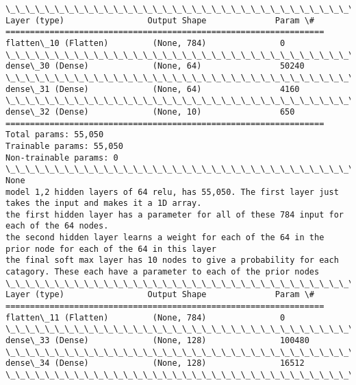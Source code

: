 \documentclass[11pt]{article}
\begin{document}
    \begin{Verbatim}[commandchars=\\\{\}]
\_\_\_\_\_\_\_\_\_\_\_\_\_\_\_\_\_\_\_\_\_\_\_\_\_\_\_\_\_\_\_\_\_\_\_\_\_\_\_\_\_\_\_\_\_\_\_\_\_\_\_\_\_\_\_\_\_\_\_\_\_\_\_\_\_
Layer (type)                 Output Shape              Param \#   
=================================================================
flatten\_10 (Flatten)         (None, 784)               0         
\_\_\_\_\_\_\_\_\_\_\_\_\_\_\_\_\_\_\_\_\_\_\_\_\_\_\_\_\_\_\_\_\_\_\_\_\_\_\_\_\_\_\_\_\_\_\_\_\_\_\_\_\_\_\_\_\_\_\_\_\_\_\_\_\_
dense\_30 (Dense)             (None, 64)                50240     
\_\_\_\_\_\_\_\_\_\_\_\_\_\_\_\_\_\_\_\_\_\_\_\_\_\_\_\_\_\_\_\_\_\_\_\_\_\_\_\_\_\_\_\_\_\_\_\_\_\_\_\_\_\_\_\_\_\_\_\_\_\_\_\_\_
dense\_31 (Dense)             (None, 64)                4160      
\_\_\_\_\_\_\_\_\_\_\_\_\_\_\_\_\_\_\_\_\_\_\_\_\_\_\_\_\_\_\_\_\_\_\_\_\_\_\_\_\_\_\_\_\_\_\_\_\_\_\_\_\_\_\_\_\_\_\_\_\_\_\_\_\_
dense\_32 (Dense)             (None, 10)                650       
=================================================================
Total params: 55,050
Trainable params: 55,050
Non-trainable params: 0
\_\_\_\_\_\_\_\_\_\_\_\_\_\_\_\_\_\_\_\_\_\_\_\_\_\_\_\_\_\_\_\_\_\_\_\_\_\_\_\_\_\_\_\_\_\_\_\_\_\_\_\_\_\_\_\_\_\_\_\_\_\_\_\_\_
None
model 1,2 hidden layers of 64 relu, has 55,050. The first layer just takes the input and makes it a 1D array.
the first hidden layer has a parameter for all of these 784 input for each of the 64 nodes.
the second hidden layer learns a weight for each of the 64 in the prior node for each of the 64 in this layer
the final soft max layer has 10 nodes to give a probability for each catagory. These each have a parameter to each of the prior nodes
\_\_\_\_\_\_\_\_\_\_\_\_\_\_\_\_\_\_\_\_\_\_\_\_\_\_\_\_\_\_\_\_\_\_\_\_\_\_\_\_\_\_\_\_\_\_\_\_\_\_\_\_\_\_\_\_\_\_\_\_\_\_\_\_\_
Layer (type)                 Output Shape              Param \#   
=================================================================
flatten\_11 (Flatten)         (None, 784)               0         
\_\_\_\_\_\_\_\_\_\_\_\_\_\_\_\_\_\_\_\_\_\_\_\_\_\_\_\_\_\_\_\_\_\_\_\_\_\_\_\_\_\_\_\_\_\_\_\_\_\_\_\_\_\_\_\_\_\_\_\_\_\_\_\_\_
dense\_33 (Dense)             (None, 128)               100480    
\_\_\_\_\_\_\_\_\_\_\_\_\_\_\_\_\_\_\_\_\_\_\_\_\_\_\_\_\_\_\_\_\_\_\_\_\_\_\_\_\_\_\_\_\_\_\_\_\_\_\_\_\_\_\_\_\_\_\_\_\_\_\_\_\_
dense\_34 (Dense)             (None, 128)               16512     
\_\_\_\_\_\_\_\_\_\_\_\_\_\_\_\_\_\_\_\_\_\_\_\_\_\_\_\_\_\_\_\_\_\_\_\_\_\_\_\_\_\_\_\_\_\_\_\_\_\_\_\_\_\_\_\_\_\_\_\_\_\_\_\_\_

\end{Verbatim}
\end{document}
